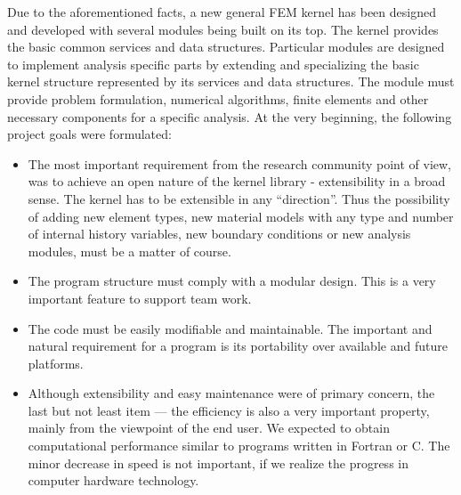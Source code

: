 \documentclass[a4paper]{article}
\begin{document}
Due to the aforementioned facts, a new general FEM kernel has been designed and developed 
with several modules being built on its top.
The kernel provides the basic common services and data
structures. 
Particular modules are designed to implement analysis specific parts by extending
and specializing the basic kernel structure represented by its
services and data structures. The module must provide problem
formulation, numerical algorithms, finite elements and other
necessary components for a specific analysis.
At the very beginning, the following project goals were formulated:
\begin{itemize}
\item
The most important requirement from the research community point of view, was to
achieve an open nature of the kernel library - extensibility in a broad sense. The
kernel has to be extensible in
any ``direction''. Thus the possibility of adding new element types, new
material models with any type and number of internal history variables,
new boundary conditions or new analysis modules, must be a matter of
course. 
\item
The program structure must comply with a modular design. This
is a very important feature to support team work. 
\item
The code must be easily modifiable and maintainable. The important and
natural requirement for a program is its portability over available
and future platforms.
\item
Although extensibility and easy maintenance were of primary concern,
the last but not least item --- the efficiency is also a very
important property, mainly from the viewpoint of the end user. We expected
to obtain computational performance similar to programs
written in Fortran or C. The minor decrease in speed is not 
important, if we realize the progress in computer hardware technology.
\end{itemize}


\end{document}
